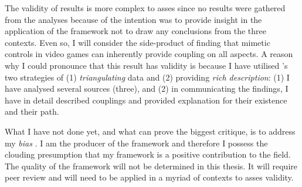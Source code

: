 The validity of results is more complex to asses since no results were gathered from the analyses because of the intention was to provide insight in the application of the framework not to draw any conclusions from the three contexts. Even so, I will consider the side-product of finding that mimetic controls in video games can inherently provide coupling on all aspects. A reason why I could pronounce that this result has validity is because I have utilised \citeauthor{cresswell}'s \citeyear{cresswell} two strategies of (1) \textit{triangulating} data and (2) providing \textit{rich description}: (1) I have analysed several sources (three), and (2) in communicating the findings, I have in detail described couplings and provided explanation for their existence and their path.

What I have not done yet, and what can prove the biggest critique, is to address my \textit{bias} \cite{cresswell}. I am the producer of the framework and therefore I possess the clouding presumption that my framework is a positive contribution to the field. The quality of the framework will not be determined in this thesis. It will require peer review and will need to be applied in a myriad of contexts to asses validity.
